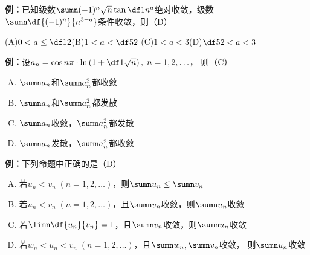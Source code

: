 %   
%   

{\bf 例：}已知级数$\sumn(-1)^n\sqrt n\tan\df1{n^a}$绝对收敛，级数
$\sumn\df{(-1)^n}{n^{3-a}}$条件收敛，则（D）

\quad (A)\;$0<a\leq \df12$\quad(B)\;$1<a<\df52$
\quad (C)\;$1<a<3$\quad(D)\;$\df52<a<3$

{\bf 例：}设$a_n=\cos n\pi\cdot\ln\left(1+\df1{\sqrt n}\right),\;n=1,2,\ldots$，
则（C）
\begin{enumerate}[(A)]
  \setlength{\itemindent}{1cm}
  \item $\sumn a_n$和$\sumn a_n^2$都收敛
  \item $\sumn a_n$和$\sumn a_n^2$都发散
  \item $\sumn a_n$收敛，$\sumn a_n^2$都发散
  \item $\sumn a_n$发散，$\sumn a_n^2$都收敛
\end{enumerate}

{\bf 例：}下列命题中正确的是（D）
\begin{enumerate}[(A)]
  \setlength{\itemindent}{1cm}
  \item 若$u_n<v_n\;(n=1,2,\ldots)$，则$\sumn u_n\leq \sumn v_n$
  \item 若$u_n<v_n\;(n=1,2,\ldots)$，且$\sumn v_n$收敛，则$\sumn u_n$收敛
  \item 若$\limn\df{u_n}{v_n}=1$，且$\sumn v_n$收敛，则$\sumn u_n$收敛
  \item 若$w_n<u_n<v_n\;(n=1,2,\ldots)$，且$\sumn w_n,\sumn v_n$收敛，
  则$\sumn u_n$收敛
\end{enumerate}

